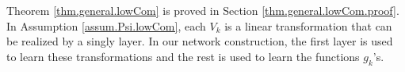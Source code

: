 \documentclass[11pt]{article} %
\begin{document}
\begin{theorem}
\end{theorem}
Theorem \ref{thm.general.lowCom} is proved in Section \ref{thm.general.lowCom.proof}. In Assumption \ref{assum.Psi.lowCom}, each $V_k$ is a linear transformation that can be realized by a singly layer. In our network construction, the first layer is used to learn these transformations and the rest is used to learn the functions $g_k$'s.
\end{document}
